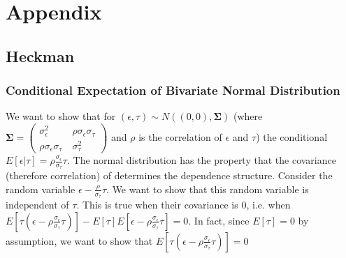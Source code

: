 \documentclass[12pt,twoside]{reedthesis}
\theoremstyle{definition}
\begin{document}

  \backmatter %

    \nocite{*}


%  
 
\nocite{*}%
%  
\appendix
\chapter{Appendix}

\section{Heckman}
\subsection{Conditional Expectation of Bivariate Normal Distribution}

We want to show that for $(\epsilon, \tau) \sim N((0,0), \boldsymbol{\Sigma})$ (where $\boldsymbol{\Sigma} = \begin{pmatrix}
\sigma_\epsilon^2 &\ \rho \sigma_\epsilon \sigma_\tau \\
\rho \sigma_\epsilon \sigma_\tau &\ \sigma_\tau^2
\end{pmatrix}$ and $\rho$ is the correlation of $\epsilon$ and $\tau$) the conditional $E[\epsilon | \tau] = \rho \frac{\sigma_\epsilon}{\sigma_\tau} \tau$. The normal distribution has the property that the covariance (therefore correlation) of determines the dependence structure. Consider the random variable $\epsilon - \frac{\rho}{\sigma_\tau} \tau$. We want to show that this random variable is independent of $\tau$. This is true when their covariance is $0$, i.e. when $E[\tau (\epsilon -\rho \frac{\sigma_\epsilon}{\sigma_\tau}\tau)] - E[\tau] E[\epsilon - \rho \frac{\sigma_\epsilon}{\sigma_\tau}  \tau] = 0$. In fact, since $E[\tau]=0$ by assumption, we want to show that $E[\tau (\epsilon -\rho \frac{\sigma_\epsilon}{\sigma_\tau} \tau)] = 0$
\end{document}
